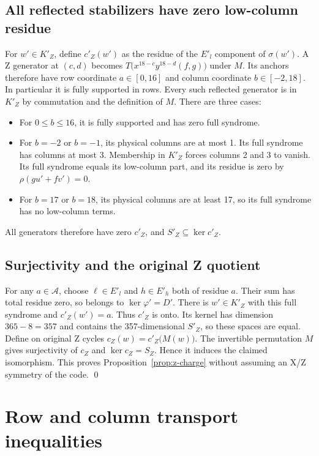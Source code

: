 \documentclass{article}
\begin{document}
\subsection{All reflected stabilizers have zero low-column residue}\label{sec:z-stabilizers}

For \(w' \in K'_Z\), define \(c'_Z(w')\) as the residue of the \(E'_l\) component of
\(\sigma(w')\). A Z generator at \((c,d)\) becomes \(T\bigl(x^{18-c} y^{18-d} (f, g)\bigr)\)
under \(M\). Its anchors therefore have row coordinate \(a \in [0,16]\) and column coordinate
\(b \in [-2,18]\). In particular it is fully supported in rows. Every such reflected
generator is in \(K'_Z\) by commutation and the definition of \(M\). There are three cases:
\begin{itemize}
  \item For \(0 \le b \le 16\), it is fully supported and has zero full syndrome.
  \item For \(b = -2\) or \(b = -1\), its physical columns are at most 1. Its full syndrome
    has columns at most 3. Membership in \(K'_Z\) forces columns 2 and 3 to vanish. Its full
    syndrome equals its low-column part, and its residue is zero by
    \(\rho(g u' + f v') = 0\).
  \item For \(b = 17\) or \(b = 18\), its physical columns are at least 17, so its full
    syndrome has no low-column terms.
\end{itemize}
All generators therefore have zero \(c'_Z\), and \(S'_Z \subseteq \ker c'_Z\).

\subsection{Surjectivity and the original Z quotient}\label{sec:z-quotient}

For any \(a \in \mathcal{A}\), choose \(\ell \in E'_l\) and \(h \in E'_h\) both of residue
\(a\). Their sum has total residue zero, so belongs to \(\ker \varphi' = D'\). There is
\(w' \in K'_Z\) with this full syndrome and \(c'_Z(w') = a\). Thus \(c'_Z\) is onto. Its
kernel has dimension \(365 - 8 = 357\) and contains the 357-dimensional \(S'_Z\), so these
spaces are equal. Define on original Z cycles \(c_Z(w) = c'_Z\bigl(M(w)\bigr)\). The
invertible permutation \(M\) gives surjectivity of \(c_Z\) and \(\ker c_Z = S_Z\). Hence it
induces the claimed isomorphism. This proves Proposition~\ref{prop:z-charge} without assuming an
X/Z symmetry of the code. \qed

\section{Row and column transport inequalities}\label{sec:transport}
\end{document}
